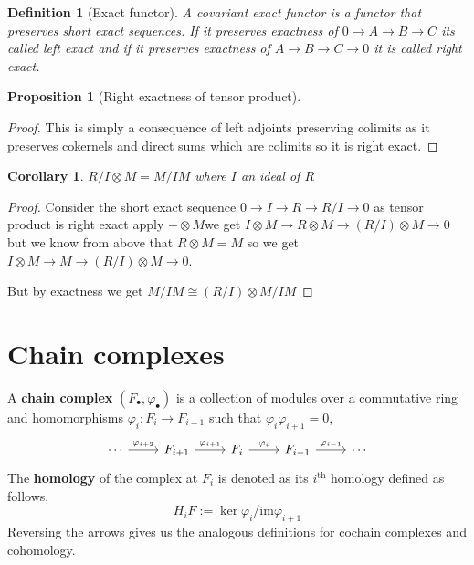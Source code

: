 \documentclass[12pt]{article}
\numberwithin{equation}{section}
\newtheorem{definition}{Definition}[section]
\newtheorem{corollary}{Corollary}[theorem]
\newtheorem{proposition}{Proposition}[section]
\begin{document}
	\begin{definition}[Exact functor]
		A covariant exact functor is a functor that preserves short exact sequences. If it preserves exactness of $0 \to A \to B \to C$ its called left exact and if it preserves exactness of $A \to B \to C \to 0$ it is called right exact. 
	\end{definition}
	
	\begin{proposition}[Right exactness of tensor product]
		
	\end{proposition}
	\begin{proof}
		This is simply a consequence of left adjoints preserving colimits as it preserves cokernels and direct sums which are colimits so it is right exact.
	\end{proof}
	
	
	\begin{corollary}
		$R/I \otimes M = M/IM$ where $I$ an ideal of $R$
	\end{corollary}
	\begin{proof}
		Consider the short exact sequence $0 \to I \to R \to R/I \to 0$ as tensor product is right exact apply $-\otimes M$we get $I \otimes M \to R \otimes M \to (R/I) \otimes M \to 0$ but we know from above that $R \otimes M = M$ so we get $ I \otimes M \to M \to (R/I) \otimes M \to 0$.
		
		But by exactness we get $M/IM \cong (R/I) \otimes M/IM$
	\end{proof}
	
%	
	
	\section{Chain complexes}
	A \textbf{chain complex} $(F_\bullet, \varphi_\bullet)$ is a collection of modules over a commutative ring and homomorphisms $\varphi_i: F_i \to F_{i-1}$ such that $\varphi_i \varphi_{i+1}=0$,
\[\begin{tikzcd}
	\cdots & {F_{i+1}} & {F_i} & {F_{i-1}} & \cdots
	\arrow["{\varphi_{i+1}}", from=1-2, to=1-3]
	\arrow["{\varphi_i}", from=1-3, to=1-4]
	\arrow["{\varphi_{i-1}}", from=1-4, to=1-5]
	\arrow["{\varphi_{i+2}}", from=1-1, to=1-2]
\end{tikzcd}\]
	The \textbf{homology} of the complex at $F_i$ is denoted as its $i^{\mathrm{th}}$ homology defined as follows,
	\[ H_iF := \ker \varphi_i/ \mathrm{im} \varphi_{i+1} \]
	Reversing the arrows gives us the analogous definitions for cochain complexes and cohomology.
	
\end{document}
